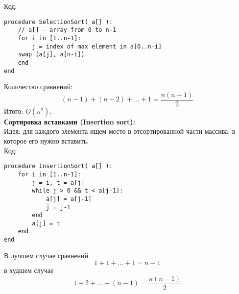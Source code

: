Код:
\begin{verbatim}
procedure SelectionSort( a[] ):
    // a[] - array from 0 to n-1
    for i in [1..n-1]:
        j = index of max element in a[0..n-i]
    swap (a[j], a[n-i])
    end
end
\end{verbatim}
Количество сравнений:
$$
(n-1)+(n-2)+...+1 = \frac{n(n-1)}{2}
$$
Итого: $O(n^2)$.\\
{\bf Сортировка вставками (Insertion sort):}\\
Идея: для каждого элемента ищем место в отсортированной части массива, в которое его нужно вставить.\\
Код:
\begin{verbatim}
procedure InsertionSort( a[] ):
    for i in [1..n-1]:
        j = i, t = a[j]
        while j > 0 && t < a[j-1]:
            a[j] = a[j-1]
            j = j-1
        end
        a[j] = t
    end
end
\end{verbatim}
В лучшем случае сравнений
$$
1 + 1 + . . . + 1 = n - 1
$$
в худшем случае
$$
1 + 2 + . . . + (n - 1) = \frac{n(n - 1)}{2}
$$
